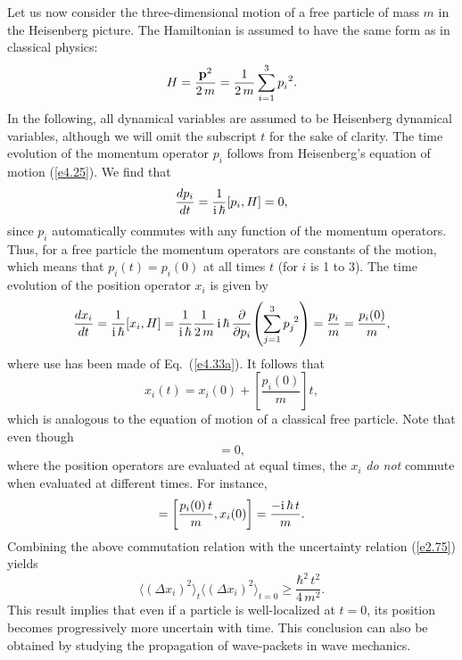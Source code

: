 Let us now consider the three-dimensional motion of a free particle of mass
$m$ in the
Heisenberg picture. The Hamiltonian is assumed to have the same form as in
classical physics:
\begin{equation}
H = \frac{{\bf p}^2}{2\,m} = \frac{1}{2\,m} \sum_{i=1}^3 p_i^{~2}.
\end{equation}
In the following, all dynamical variables are assumed to be Heisenberg dynamical
variables, although we will omit the subscript $t$ for the sake of clarity. 
The time evolution of the momentum operator $p_i$ follows from Heisenberg's
equation of motion (\ref{e4.25}). We find that
\begin{equation}
\frac{dp_i}{dt} = \frac{1}{{\rm i}\,\hbar}[p_i, H] = 0,
\end{equation}
since $p_i$ automatically commutes with any function of the momentum operators. 
Thus, for a free particle the momentum operators are constants of the motion,
which means that $p_i(t) = p_i(0)$ at all times $t$ (for $i$ is 1 to 3). 
The time evolution of the position operator $x_i$ is given by
\begin{equation}
\frac{d x_i}{dt} = \frac{1}{{\rm i}\,\hbar} [x_i, H] = \frac{1}{{\rm i}\,\hbar}
\frac{1}{2\,m}\, {\rm i}\,\hbar\,\frac{\partial}{\partial p_i}\!
\left(\sum_{j=1}^3 p_j^{~2}\right) = \frac{p_i}{m} = \frac{p_i(0)}{m},
\end{equation}
where use has been made of Eq.~(\ref{e4.33a}).  It follows that
\begin{equation}
x_i(t) = x_i(0) + \left[\frac{p_i(0)}{m}\right] t,
\end{equation}
which is analogous to the equation of motion of a classical free particle.
Note that even though
\begin{equation}
[x_i(0), x_j(0)] = 0,
\end{equation}
where the position operators are evaluated at equal times, the $x_i$ {\em do not}
commute when evaluated at different times. For instance,
\begin{equation}
[x_i(t), x_i(0)] = \left[ \frac{p_i(0)\,t}{m}, x_i(0)\right] = 
\frac{-{\rm i}\,\hbar \,t}
{m}.
\end{equation}
Combining the above commutation relation with the uncertainty relation (\ref{e2.75}) yields
\begin{equation}
\langle (\Delta x_i)^2\rangle_t \langle (\Delta x_i)^2\rangle_{t=0} \geq
\frac{\hbar^2\, t^2}{4\, m^2}.
\end{equation}
This result implies that even if a particle is well-localized at $t=0$, its
position becomes progressively more uncertain with time. This conclusion
can also be obtained by studying the propagation of wave-packets in
wave mechanics.

